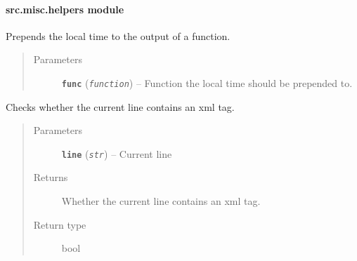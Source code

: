 \documentclass[letterpaper,10pt,english]{sphinxmanual}
\begin{document}
\paragraph{src.misc.helpers module}
\label{src.misc:src-misc-helpers-module}\label{src.misc:module-src.misc.helpers}

\begin{fulllineitems}
\label{src.misc:src.misc.helpers.alt}
Prepends the local time to the output of a function.
\begin{quote}\begin{description}
\item[{Parameters}] \leavevmode
\textbf{\texttt{func}} (\emph{\texttt{function}}) -- Function the local time should be prepended to.

\end{description}\end{quote}

\end{fulllineitems}


\begin{fulllineitems}
\label{src.misc:src.misc.helpers.capitalize}
\end{fulllineitems}


\begin{fulllineitems}
\label{src.misc:src.misc.helpers.contains_tag}
Checks whether the current line contains an xml tag.
\begin{quote}\begin{description}
\item[{Parameters}] \leavevmode
\textbf{\texttt{line}} (\emph{\texttt{str}}) -- Current line

\item[{Returns}] \leavevmode
Whether the current line contains an xml tag.

\item[{Return type}] \leavevmode
bool

\end{description}\end{quote}

\end{fulllineitems}
\end{document}
